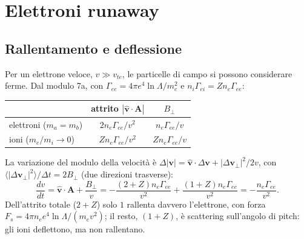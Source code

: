 \section{Elettroni runaway}

\subsection{Rallentamento e deflessione}
Per un elettrone veloce, $v\gg v_{te}$, le particelle di campo si possono considerare ferme. Dal modulo 7a, con $\Gamma_{ee}=4\pi e^4\ln\Lambda/m_e^2$ e $n_i\Gamma_{ei}=Zn_e\Gamma_{ee}$:
\begin{center}
\small
\begin{tabular}{|l|c|c|}
\hline
 & attrito $|\hat{\mathbf{v}}\cdot\mathbf{A}|$ & $B_\perp$\\
\hline
elettroni ($m_a=m_b$) & $2n_e\Gamma_{ee}/v^2$ & $n_e\Gamma_{ee}/v$\\
\hline
ioni ($m_e/m_i\to0$) & $Zn_e\Gamma_{ee}/v^2$ & $Zn_e\Gamma_{ee}/v$\\
\hline
\end{tabular}
\end{center}
La variazione del modulo della velocità è $\Delta|\mathbf{v}|=\hat{\mathbf{v}}\cdot\Delta\mathbf{v}+|\Delta\mathbf{v}_\perp|^2/2v$, con $\langle|\Delta\mathbf{v}_\perp|^2\rangle/\Delta t=2B_\perp$ (due direzioni trasverse):
\begin{equation}
\frac{dv}{dt}=\hat{\mathbf{v}}\cdot\mathbf{A}+\frac{B_\perp}{v}=-\frac{(2+Z)n_e\Gamma_{ee}}{v^2}+\frac{(1+Z)n_e\Gamma_{ee}}{v^2}=-\frac{n_e\Gamma_{ee}}{v^2}.
\end{equation}
Dell'attrito totale ($2+Z$) solo $1$ rallenta davvero l'elettrone, con forza $F_s=4\pi n_ee^4\ln\Lambda/(m_ev^2)$; il resto, $(1+Z)$, è scattering sull'angolo di pitch: gli ioni deflettono, ma non rallentano.


